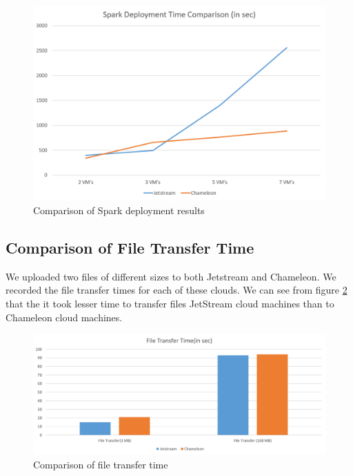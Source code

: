 \documentclass[9pt,twocolumn,twoside]{../../styles/osajnl}
\begin{document}
\begin{figure}[h]
	\centering
	\includegraphics[width=\linewidth,scale=1]{images/spd2.png}
	\caption{Comparison of Spark deployment results}
	\label{fig:spd}
\end{figure}

\subsection{Comparison of File Transfer Time}

We uploaded two files of different sizes to both Jetstream and Chameleon. We recorded the file transfer times for each of these clouds. We can see from figure \ref{fig:ftt} that the it took lesser time to transfer files JetStream cloud machines than to Chameleon cloud machines.

\begin{figure}[h]
	\centering
	\includegraphics[width=\linewidth,scale=1]{images/Filetransfer.png}
	\caption{Comparison of file transfer time}
	\label{fig:ftt}
\end{figure}
\end{document}
